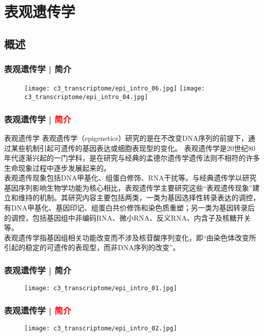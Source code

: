 \section{表观遗传学}
\subsection{概述}
\begin{frame}
  \frametitle{表观遗传学 | 简介}
  \begin{figure}
    \centering
    \texttt{[image: c3\_transcriptome/epi\_intro\_06.jpg]}
    \texttt{[image: c3\_transcriptome/epi\_intro\_04.jpg]}
  \end{figure}
\end{frame}

\begin{frame}
  \frametitle{表观遗传学 | \textcolor{red}{简介}}
  \begin{block}{表观遗传学}
表观遗传学（epigenetics）研究的是在不改变DNA序列的前提下，通过某些机制引起可遗传的基因表达或细胞表现型的变化。 表观遗传学是20世纪80年代逐渐兴起的一门学科，是在研究与经典的孟德尔遗传学遗传法则不相符的许多生命现象过程中逐步发展起来的。\\
\vspace{1em}
表观遗传现象包括DNA甲基化、组蛋白修饰、RNA干扰等。与经典遗传学以研究基因序列影响生物学功能为核心相比，表观遗传学主要研究这些“表观遗传现象”建立和维持的机制。其研究内容主要包括两类，一类为基因选择性转录表达的调控，有DNA甲基化、基因印记、组蛋白共价修饰和染色质重塑；另一类为基因转录后的调控，包括基因组中非编码RNA、微小RNA、反义RNA、内含子及核糖开关等。\\
\vspace{1em}
表观遗传学指基因组相关功能改变而不涉及核苷酸序列变化，即“由染色体改变所引起的稳定的可遗传的表现型，而非DNA序列的改变”。
  \end{block}
\end{frame}

\begin{frame}
  \frametitle{表观遗传学 | 简介}
  \begin{figure}
    \centering
    \texttt{[image: c3\_transcriptome/epi\_intro\_01.jpg]}
  \end{figure}
\end{frame}

\begin{frame}
  \frametitle{表观遗传学 | \textcolor{red}{简介}}
  \begin{figure}
    \centering
    \texttt{[image: c3\_transcriptome/epi\_intro\_02.jpg]}
  \end{figure}
\end{frame}


